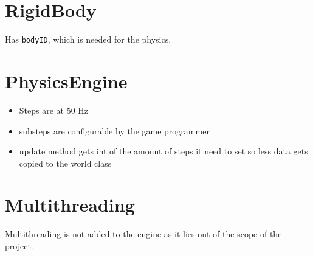\documentclass[draft]{article}
\begin{document}
\section{RigidBody}
Has \texttt{bodyID}, which is needed for the physics.

\section{PhysicsEngine}{
  \begin{itemize}
    \item Steps are at 50 Hz
    \item substeps are configurable by the game programmer
    \item update method gets int of the amount of steps it need to set so less data gets copied to the world class
  \end{itemize}
}

\section{Multithreading}
Multithreading is not added to the engine as it lies out of the scope of the project.
\end{document}
